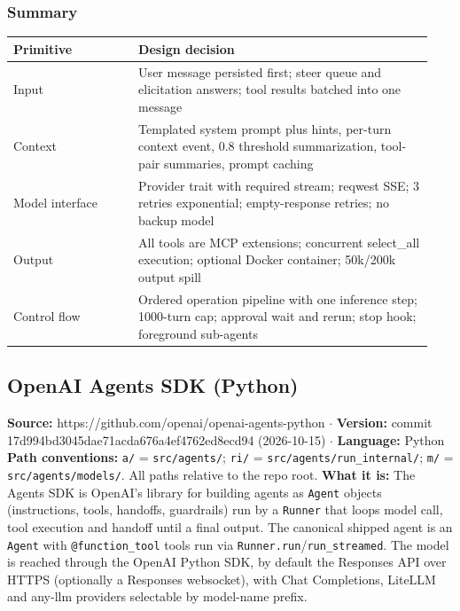 \subsubsection*{Summary}
\begin{longtable}{@{}p{0.28\linewidth}p{0.66\linewidth}@{}}
\toprule \textbf{Primitive} & \textbf{Design decision} \\ \midrule \endhead
Input & User message persisted first; steer queue and elicitation answers; tool results batched into one message \\
Context & Templated system prompt plus hints, per-turn context event, 0.8 threshold summarization, tool-pair summaries, prompt caching \\
Model interface & Provider trait with required stream; reqwest SSE; 3 retries exponential; empty-response retries; no backup model \\
Output & All tools are MCP extensions; concurrent select\_all execution; optional Docker container; 50k/200k output spill \\
Control flow & Ordered operation pipeline with one inference step; 1000-turn cap; approval wait and rerun; stop hook; foreground sub-agents \\
\bottomrule \end{longtable}


\subsection{OpenAI Agents SDK (Python)}

\textbf{Source:} https://github.com/openai/openai-agents-python $\cdot$ \textbf{Version:} commit 17d994bd3045dae71acda676a4ef4762ed8ecd94 (2026-10-15) $\cdot$ \textbf{Language:} Python
\textbf{Path conventions:} \texttt{a/\allowbreak{}} = \texttt{src/\allowbreak{}agents/\allowbreak{}}; \texttt{ri/\allowbreak{}} = \texttt{src/\allowbreak{}agents/\allowbreak{}run\_\allowbreak{}internal/\allowbreak{}}; \texttt{m/\allowbreak{}} = \texttt{src/\allowbreak{}agents/\allowbreak{}models/\allowbreak{}}. All paths relative to the repo root.
\textbf{What it is:} The Agents SDK is OpenAI's library for building agents as \texttt{Agent} objects (instructions, tools, handoffs, guardrails) run by a \texttt{Runner} that loops model call, tool execution and handoff until a final output. The canonical shipped agent is an \texttt{Agent} with \texttt{@function\_\allowbreak{}tool} tools run via \texttt{Runner.\allowbreak{}run}/\texttt{run\_\allowbreak{}streamed}. The model is reached through the OpenAI Python SDK, by default the Responses API over HTTPS (optionally a Responses websocket), with Chat Completions, LiteLLM and any-llm providers selectable by model-name prefix.

